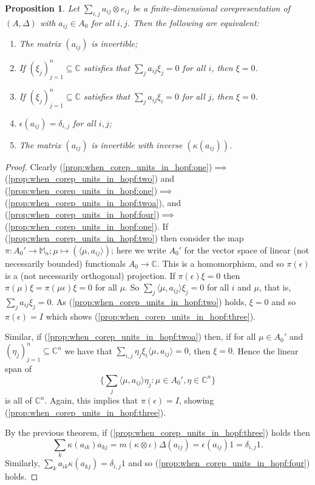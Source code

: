 \documentclass[twoside,a4paper,12pt]{article}
\theoremstyle{plain}
\newtheorem{proposition}{Proposition}[section]
\theoremstyle{definition}
\newcommand{\ip}[2]{\langle #1,#2 \rangle}
\begin{document}
\begin{proposition}\label{prop:when_corep_units_in_hopf}
Let $\sum_{i,j} a_{ij} \otimes e_{ij}$ be a finite-dimensional corepresentation
of $(A,\Delta)$ with $a_{ij}\in A_0$ for all $i,j$.
Then the following are equivalent:
\begin{enumerate}
\item\label{prop:when_corep_units_in_hopf:one}
The matrix $(a_{ij})$ is invertible;
\item\label{prop:when_corep_units_in_hopf:two}
If $(\xi_j)_{j=1}^n \subseteq \mathbb C$ satisfies that
   $\sum_j a_{ij} \xi_j = 0$ for all $i$, then $\xi=0$.
\item\label{prop:when_corep_units_in_hopf:twoa}
If $(\xi_j)_{j=1}^n \subseteq \mathbb C$ satisfies that
   $\sum_j a_{ij} \xi_i = 0$ for all $j$, then $\xi=0$.
\item\label{prop:when_corep_units_in_hopf:three}
$\epsilon(a_{ij})=\delta_{i,j}$ for all $i,j$;
\item\label{prop:when_corep_units_in_hopf:four}
The matrix $(a_{ij})$ is invertible with inverse $(\kappa(a_{ij}))$.
\end{enumerate}
\end{proposition}
\begin{proof}
Clearly (\ref{prop:when_corep_units_in_hopf:one})$\implies$%
(\ref{prop:when_corep_units_in_hopf:two}) and
(\ref{prop:when_corep_units_in_hopf:one})$\implies$%
(\ref{prop:when_corep_units_in_hopf:twoa}), and
(\ref{prop:when_corep_units_in_hopf:four})$\implies$%
(\ref{prop:when_corep_units_in_hopf:one}).
If (\ref{prop:when_corep_units_in_hopf:two}) then consider the map
$\pi:A_0' \rightarrow \mathbb M_n; \mu\mapsto (\ip{\mu}{a_{ij}})$; here we
write $A_0'$ for the vector space of linear (not necessarily bounded) functionals
$A_0\rightarrow\mathbb C$.  This is
a homomorphism, and so $\pi(\epsilon)$ is a (not necessarily orthogonal)
projection.  If $\pi(\epsilon)\xi=0$ then $\pi(\mu)\xi = \pi(\mu\epsilon)\xi=0$
for all $\mu$.  So $\sum_j \ip{\mu}{a_{ij}} \xi_j = 0$ for all $i$ and $\mu$,
that is, $\sum_j a_{ij}\xi_j=0$.  As (\ref{prop:when_corep_units_in_hopf:two})
holds, $\xi=0$ and so $\pi(\epsilon)=I$ which shows
(\ref{prop:when_corep_units_in_hopf:three}).

Similar, if (\ref{prop:when_corep_units_in_hopf:twoa}) then, if for all
$\mu\in A_0'$ and $(\eta_j)_{j=1}^n\subseteq\mathbb C^n$ we have that
$\sum_{i,j} \eta_j \xi_i \ip{\mu}{a_{ij}} = 0$, then $\xi=0$.  Hence
the linear span of
\[ \big\{ \sum_j \ip{\mu}{a_{ij}} \eta_j : \mu\in A_0', \eta\in\mathbb C^n
\big\} \]
is all of $\mathbb C^n$.  Again, this implies that $\pi(\epsilon)=I$, showing
(\ref{prop:when_corep_units_in_hopf:three}).

By the previous theorem,
if (\ref{prop:when_corep_units_in_hopf:three}) holds then
\[ \sum_k \kappa(a_{ik}) a_{kj} = m(\kappa\otimes\iota)\Delta(a_{ij})
= \epsilon(a_{ij}) 1 = \delta_{i,j}1. \]
Similarly, $\sum_k a_{ik} \kappa(a_{kj}) = \delta_{i,j}1$ and so
(\ref{prop:when_corep_units_in_hopf:four}) holds.
\end{proof}
\end{document}
